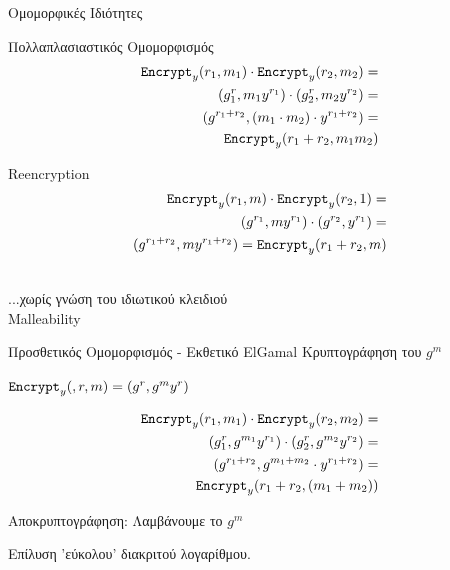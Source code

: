 \documentclass[handout]{beamer}
\begin{document}
\begin{frame}[allowframebreaks]{Ομομορφικές Ιδιότητες}

\begin{block}{Πολλαπλασιαστικός Ομομορφισμός}
\begin{align*}
\mathtt{Encrypt}_y(r_1,m_1) \cdot \mathtt{Encrypt}_y(r_2,m_2) = \\
(g^r_1, m_1 y^{r_1}) \cdot (g^r_2, m_2 y^{r_2}) =\\
(g^{r_1+r_2}, (m_1 \cdot m_2) \cdot y^{r_1+r_2}) = \\
\mathtt{Encrypt}_y( r_1+r_2,m_1  m_2)
\end{align*}
\end{block}

\framebreak

\begin{block}{Reencryption}
\begin{align*}
\mathtt{Encrypt}_y(r_1,m) \cdot \mathtt{Encrypt}_y(r_2,1) = \\
(g^{r_1}, my^{r_1}) \cdot (g^{r_2},  y^{r_1}) =\\
(g^{r_1+r_2}, my^{r_1+r_2}) =
\mathtt{Encrypt}_y(r_1+r_2,m) 
\end{align*}
\end{block}
 \\
\alert{...χωρίς γνώση του ιδιωτικού κλειδιού} \\
\alert{Malleability}

\framebreak

\begin{block}{Προσθετικός Ομομορφισμός - Εκθετικό ElGamal}
Κρυπτογράφηση του $g^m$ 

$\mathtt{Encrypt}_y(,r,m) = (g^r, g^m y^r)$

\begin{align*}
  \mathtt{Encrypt}_y(r_1,m_1) \cdot \mathtt{Encrypt}_y(r_2,m_2) = \\
(g^r_1, g^{m_1} y^{r_1}) \cdot  (g^r_2, g^{m_2} y^{r_2}) =\\
(g^{r_1+r_2} , g^{m_1 + m_2} \cdot y^{r_1+r_2}) = \\
\mathtt{Encrypt}_y(r_1+r_2,(m_1 + m_2))
\end{align*}

Αποκρυπτογράφηση: Λαμβάνουμε το $g^m$

\alert{Επίλυση 'εύκολου' διακριτού λογαρίθμου}.

\end{block}

\end{frame}
\end{document}
